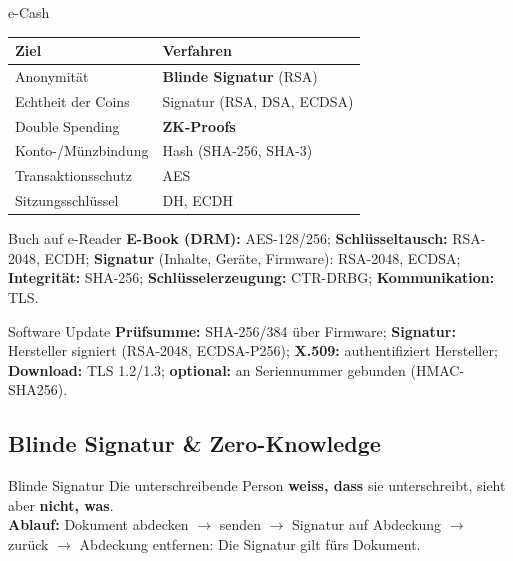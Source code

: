 \documentclass[a4paper, fontsize=7pt]{scrartcl}
\renewcommand*{\arraystretch}{1.5}  %
\begin{document}
\begin{mainbox}{e-Cash}
\renewcommand*{\arraystretch}{1.15}
\setlength{\tabcolsep}{3pt}
\begin{tabularx}{\linewidth}{@{}>{\raggedright\arraybackslash}X|>{\raggedright\arraybackslash}X@{}}
\textbf{Ziel} & \textbf{Verfahren} \\
\hline
Anonymität & \textbf{Blinde Signatur} (RSA) \\
Echtheit der Coins & Signatur (RSA, DSA, ECDSA) \\
Double Spending & \textbf{ZK-Proofs} \\
Konto-/Münzbindung & Hash (SHA-256, SHA-3) \\
Transaktionsschutz & AES \\
Sitzungsschlüssel & DH, ECDH \\
\end{tabularx}
\end{mainbox}

\begin{subbox}{Buch auf e-Reader}
\textbf{E-Book (DRM):} AES-128/256; \textbf{Schlüsseltausch:} RSA-2048, ECDH;
\textbf{Signatur} (Inhalte, Geräte, Firmware): RSA-2048, ECDSA;
\textbf{Integrität:} SHA-256; \textbf{Schlüsselerzeugung:} CTR-DRBG;
\textbf{Kommunikation:} TLS.
\end{subbox}

\begin{subbox}{Software Update}
\textbf{Prüfsumme:} SHA-256/384 über Firmware; \textbf{Signatur:} Hersteller
signiert (RSA-2048, ECDSA-P256); \textbf{X.509:} authentifiziert Hersteller;
\textbf{Download:} TLS 1.2/1.3; \textbf{optional:} an Seriennummer gebunden
(HMAC-SHA256).
\end{subbox}

\subsection{Blinde Signatur \& Zero-Knowledge}

\begin{mainbox}{Blinde Signatur}
Die unterschreibende Person \textbf{weiss, dass} sie unterschreibt, sieht aber
\textbf{nicht, was}.\\
\textbf{Ablauf:} Dokument abdecken $\to$ senden $\to$ Signatur auf Abdeckung $\to$
zurück $\to$ Abdeckung entfernen: Die Signatur gilt fürs Dokument.
\end{mainbox}
\end{document}
